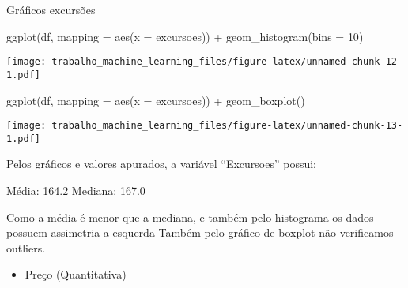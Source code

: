 \documentclass[
]{article}
\newenvironment{Shaded}{\begin{snugshade}}{\end{snugshade}}
\newcommand{\AttributeTok}[1]{\textcolor[rgb]{0.77,0.63,0.00}{#1}}
\newcommand{\CommentTok}[1]{\textcolor[rgb]{0.56,0.35,0.01}{\textit{#1}}}
\newcommand{\DecValTok}[1]{\textcolor[rgb]{0.00,0.00,0.81}{#1}}
\newcommand{\FloatTok}[1]{\textcolor[rgb]{0.00,0.00,0.81}{#1}}
\newcommand{\FunctionTok}[1]{\textcolor[rgb]{0.00,0.00,0.00}{#1}}
\newcommand{\NormalTok}[1]{#1}
\newcommand{\OtherTok}[1]{\textcolor[rgb]{0.56,0.35,0.01}{#1}}
\newcommand{\SpecialCharTok}[1]{\textcolor[rgb]{0.00,0.00,0.00}{#1}}
\newcommand{\StringTok}[1]{\textcolor[rgb]{0.31,0.60,0.02}{#1}}
\providecommand{\tightlist}{%
  \setlength{\itemsep}{0pt}\setlength{\parskip}{0pt}}
\begin{document}
\begin{Shaded}
\end{Shaded}

Gráficos excursões

\begin{Shaded}
\begin{Highlighting}[]
\FunctionTok{ggplot}\NormalTok{(df, }\AttributeTok{mapping =} \FunctionTok{aes}\NormalTok{(}\AttributeTok{x =} \StringTok{\textasciigrave{}}\AttributeTok{excursoes}\StringTok{\textasciigrave{}}\NormalTok{)) }\SpecialCharTok{+}
  \FunctionTok{geom\_histogram}\NormalTok{(}\AttributeTok{bins =} \DecValTok{10}\NormalTok{)}
\end{Highlighting}
\end{Shaded}

\texttt{[image: trabalho\_machine\_learning\_files/figure-latex/unnamed-chunk-12-1.pdf]}

\begin{Shaded}
\begin{Highlighting}[]
\FunctionTok{ggplot}\NormalTok{(df, }\AttributeTok{mapping =} \FunctionTok{aes}\NormalTok{(}\AttributeTok{x =} \StringTok{\textasciigrave{}}\AttributeTok{excursoes}\StringTok{\textasciigrave{}}\NormalTok{)) }\SpecialCharTok{+}
  \FunctionTok{geom\_boxplot}\NormalTok{()}
\end{Highlighting}
\end{Shaded}

\texttt{[image: trabalho\_machine\_learning\_files/figure-latex/unnamed-chunk-13-1.pdf]}

Pelos gráficos e valores apurados, a variável ``Excursoes'' possui:

Média: 164.2 Mediana: 167.0

Como a média é menor que a mediana, e também pelo histograma os dados
possuem assimetria a esquerda Também pelo gráfico de boxplot não
verificamos outliers.

\begin{itemize}
\tightlist
\item
  Preço (Quantitativa)
\end{itemize}
\end{document}
